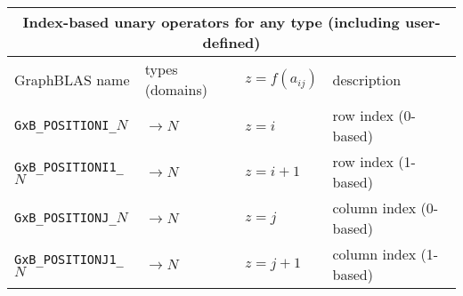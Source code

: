 \documentclass[12pt]{article}
\begin{document}
{\vspace{0.2in}
\begin{tabular}{|llll|}
\hline
\multicolumn{4}{|c|}{Index-based unary operators for any type (including user-defined)} \\
\hline
GraphBLAS name            & types (domains)   & $z=f(a_{ij})$      & description \\
\hline
\verb'GxB_POSITIONI_'$N$  & $ \rightarrow N$  & $z = i$       & row index (0-based) \\
\verb'GxB_POSITIONI1_'$N$ & $ \rightarrow N$  & $z = i+1$     & row index (1-based) \\
\verb'GxB_POSITIONJ_'$N$  & $ \rightarrow N$  & $z = j$       & column index (0-based) \\
\verb'GxB_POSITIONJ1_'$N$ & $ \rightarrow N$  & $z = j+1$     & column index (1-based) \\
\hline
\end{tabular}
\vspace{0.2in}

}
\end{document}
